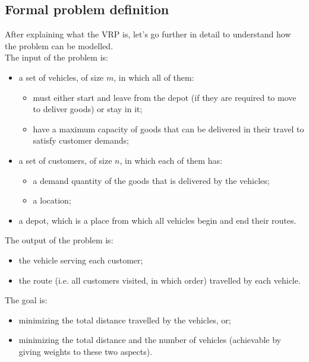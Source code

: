 \documentclass[../main.tex]{subfiles}
\begin{document}
\subsection{Formal problem definition}
\label{subsec:formal-problem-definition}
After explaining what the VRP is, let's go further in detail to understand how the problem can be modelled.\\
The input of the problem is:
\begin{itemize}
    \item a set of vehicles, of size $m$, in which all of them:
    \begin{itemize}
        \item must either start and leave from the depot (if they are required to move to deliver goods) or stay in it;
        \item have a maximum capacity of goods that can be delivered in their travel to satisfy customer demands;
    \end{itemize}
    \item a set of customers, of size $n$, in which each of them has:
    \begin{itemize}
        \item a demand quantity of the goods that is delivered by the vehicles;
        \item a location;
    \end{itemize}
    \item a depot, which is a place from which all vehicles begin and end their routes.
\end{itemize}
The output of the problem is:
\begin{itemize}
    \item the vehicle serving each customer;
    \item the route (i.e. all customers visited, in which order) travelled by each vehicle.
\end{itemize}
The goal is:
\begin{itemize}
    \item minimizing the total distance travelled by the vehicles, or;
    \item minimizing the total distance and the number of vehicles (achievable by giving weights to these two aspects).
\end{itemize}
\end{document}
